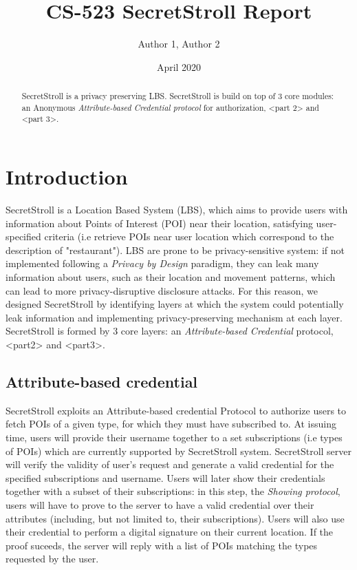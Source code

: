 \documentclass[10pt,conference,compsocconf]{IEEEtran}
\title{CS-523 SecretStroll Report}
\author{Author 1, Author 2}
\date{April 2020}
\begin{document}
\maketitle

\begin{abstract}
    SecretStroll is a privacy preserving LBS. SecretStroll is build on top of 3 core modules: an Anonymous
    \textit{Attribute-based Credential protocol} for authorization, <part 2> and <part 3>.
\end{abstract}

\section{Introduction}
SecretStroll is a Location Based System (LBS), which aims to provide users with information about Points of Interest (POI)
near their location, satisfying user-specified criteria (i.e retrieve POIs near user location which correspond to the description
of "restaurant").\newline
LBS are prone to be privacy-sensitive system: if not implemented following a \textit{Privacy by Design} paradigm, they can leak
many information about users, such as their location and movement patterns, which can lead to more privacy-disruptive disclosure attacks.
For this reason, we designed SecretStroll by identifying layers at which the system could potentially leak information and implementing
privacy-preserving mechanism at each layer.\newline
SecretStroll is formed by 3 core layers: an \textit{Attribute-based Credential} protocol, <part2> and <part3>.
\subsection{Attribute-based credential}
SecretStroll exploits an Attribute-based credential Protocol to authorize users to fetch POIs of a given type, for which they must have subscribed to.
At issuing time, users will provide their username together to a set subscriptions (i.e types of POIs) which are currently supported
by SecretStroll system. SecretStroll server will verify the validity of user's request and generate a valid credential for the specified
subscriptions and username. Users will later show their credentials together with a subset of their subscriptions: in this step,
the \textit{Showing protocol}, users will have to prove to the server to have a valid credential over their attributes
(including, but not limited to, their subscriptions). Users will also use their credential to perform a digital signature
on their current location. If the proof suceeds, the server will reply with a list of POIs matching the types requested by the user.
\end{document}

